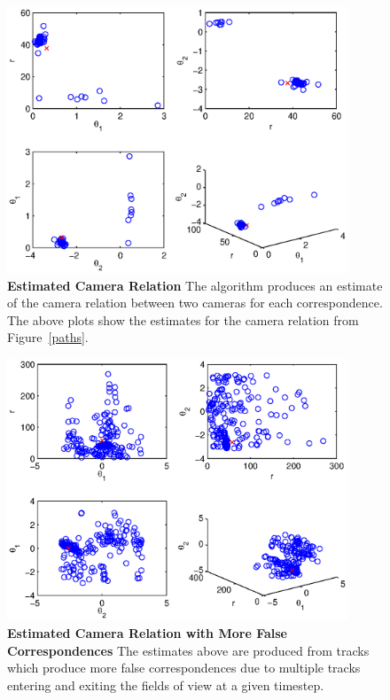 \documentclass[journal]{IEEEtran}
\begin{document}
	\begin{figure}
		\centering
		\includegraphics[width=4in]{./point_cloud.eps}
		\caption{\textbf{Estimated Camera Relation} The algorithm produces an estimate 
											of the camera relation between two
											cameras for each correspondence. 
											The above plots show the estimates
											for the camera relation from
											Figure~\ref{paths}.}
		\label{point_cloud}
	\end{figure}

	
	\begin{figure}
		\centering
		\includegraphics[width=4in]{./noisy_point_cloud.eps}
		\caption{\textbf{Estimated Camera Relation with More False Correspondences} 
					The estimates above are produced from tracks which produce
					more false correspondences due to multiple tracks entering and
					exiting the fields of view at a given timestep.}
		\label{noisy_point_cloud}
	\end{figure}
		
\end{document}
